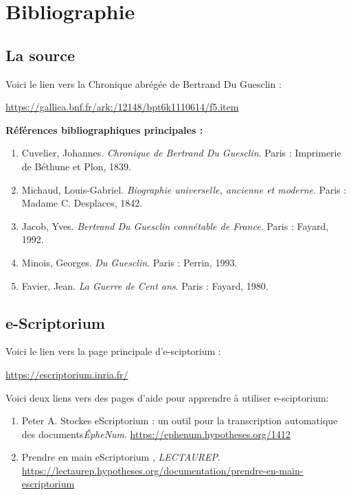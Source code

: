 \documentclass{article}
\begin{document}
\section{Bibliographie}

\subsection{La source}

Voici le lien vers la Chronique abrégée de Bertrand Du Guesclin : 

\setlength{\parskip}{0.5cm}

\href{https://gallica.bnf.fr/ark:/12148/bpt6k1110614/f5.item}{https://gallica.bnf.fr/ark:/12148/bpt6k1110614/f5.item}

\noindent\textbf{Références bibliographiques principales :}

\begin{enumerate}
\item Cuvelier, Johannes. \textit{Chronique de Bertrand Du Guesclin}. Paris : Imprimerie de Béthune et Plon, 1839.
\item Michaud, Louis-Gabriel. \textit{Biographie universelle, ancienne et moderne}. Paris : Madame C. Desplaces, 1842.
\item Jacob, Yves. \textit{Bertrand Du Guesclin connétable de France}. Paris : Fayard, 1992.
\item Minois, Georges. \textit{Du Guesclin}. Paris : Perrin, 1993.
\item Favier, Jean. \textit{La Guerre de Cent ans}. Paris : Fayard, 1980.
\end{enumerate}

\subsection{e-Scriptorium}

Voici le lien vers la page principale d'e-sciptorium : 

\setlength{\parskip}{0.5cm}

\href{https://escriptorium.inria.fr/}{https://escriptorium.inria.fr/}

Voici deux liens vers des pages d'aide pour apprendre à utiliser e-sciptorium:  

\begin{enumerate}
    \item Peter A. Stockes \og eScriptorium : un outil pour la transcription automatique des documents\fg \:\textit{ÉpheNum}. \url{https://ephenum.hypotheses.org/1412}
    \item \og Prendre en main eScriptorium \fg, \textit{LECTAUREP}. \url{https://lectaurep.hypotheses.org/documentation/prendre-en-main-escriptorium}
\end{enumerate}
\end{document}
